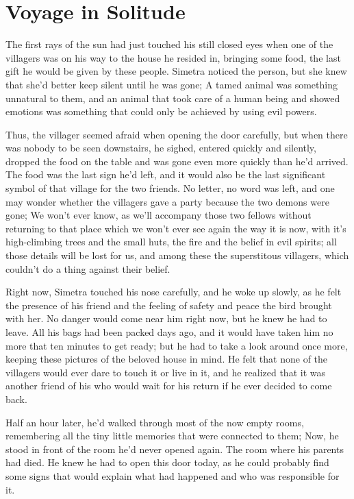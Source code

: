 \chapter{Voyage in Solitude}
\label{cha:voyage-solitude}
The first rays of the sun had just touched his still closed eyes when one of the villagers was on his way to the house he resided in, bringing some food, the last gift he would be given by these people. Simetra noticed the person, but she knew that she'd better keep silent until he was gone; A tamed animal was something unnatural to them, and an animal that took care of a human being and showed emotions was something that could only be achieved by using evil powers.

Thus, the villager seemed afraid when opening the door carefully, but when there was nobody to be seen downstairs, he sighed, entered quickly and silently, dropped the food on the table and was gone even more quickly than he'd arrived.
The food was the last sign he'd left, and it would also be the last significant symbol of that village for the two friends. No letter, no word was left, and one may wonder whether the villagers gave a party because the two demons were gone; We won't ever know, as we'll accompany those two fellows without returning to that place which we won't ever see again the way it is now, with it's high-climbing trees and the small huts, the fire and the belief in evil spirits; all those details will be lost for us, and among these the superstitous villagers, which couldn't do a thing against their belief.

Right now, Simetra touched his nose carefully, and he woke up slowly, as he felt the presence of his friend and the feeling of safety and peace the bird brought with her. No danger would come near him right now, but he knew he had to leave. All his bags had been packed days ago, and it would have taken him no more that ten minutes to get ready; but he had to take a look around once more, keeping these pictures of the beloved house in mind. He felt that none of the villagers would ever dare to touch it or live in it, and he realized that it was another friend of his who would wait for his return if he ever decided to come back.

Half an hour later, he'd walked through most of the now empty rooms, remembering all the tiny little memories that were connected to them; Now, he stood in front of the room he'd never opened again.
The room where his parents had died. He knew he had to open this door today, as he could probably find some signs that would explain what had happened and who was responsible for it.

